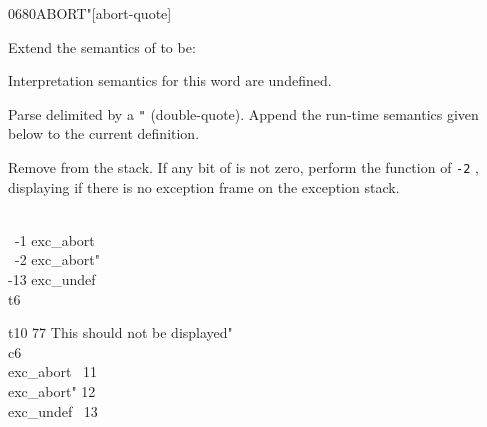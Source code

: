 \begin{worddef}[ABORTq]{0680}{ABORT"}[abort-quote]
\item Extend the semantics of  to be:

\interpret
	Interpretation semantics for this word are undefined.

\compile

	Parse  delimited by a \texttt{"} (double-quote).
	Append the run-time semantics given below to the current
	definition.

\runtime

	Remove  from the stack. If any bit of 
	is not zero, perform the function of \texttt{-2} ,
	displaying  if there is no exception frame on the
	exception stack.


	\begin{testing}\ttfamily
		 \\
		\mbox{}~-1	 exc\_abort \\
		\mbox{}~-2  exc\_abort" \\
		-13  exc\_undef \\
		\word{:} t6  \word{;}


		\word{:} t10 77   This should not be displayed" \word{;} \\
		\word{:} c6  \\
		\tab {} exc\_abort~  11  \\
		\tab[3.5]		 exc\_abort"  12  \\
		\tab[3.5]		 exc\_undef~  13  \\
		\tab {} \\
		\word{;}

		 \tab {}  \\
		 \tab {}  \\
		 \tab {} 
	\end{testing}
\end{worddef}
